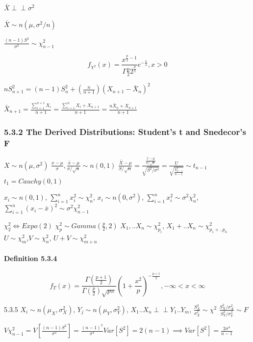 \documentclass[6pt,twocolumn,Portrait]{article}
\let\oldparagraph\paragraph
\renewcommand{\paragraph}[1]{\oldparagraph{#1}\mbox{}}
\begin{document}
\(\bar X\perp\!\!\!\perp\sigma^2\)

\(\bar X\sim n(\mu,\sigma^2/n)\)

\(\frac{(n-1)S^2}{\sigma^2}\sim\chi^2_{n-1}\)

\[f_{\chi^2}(x)=\frac{x^{\frac{p}2-1}}{\Gamma \frac{p}2 2^{\frac{p}2}}e^{-\frac{x}2}, x>0\]

\(nS^2_{n+1}=(n-1)S_n^2+(\frac{n}{n+1})(X_{n+1}-\bar X_n)^2\)

\(\bar X_{n+1}=\frac{\sum_{i=1}^{n+1}X_{i}}{n+1}=\frac{\sum_{i=1}^{n}X_{i}+X_{n+1}}{n+1}=\frac{n\bar X_{n}+X_{n+1}}{n+1}\)

\hypertarget{the-derived-distributions-students-t-and-snedecors-f}{%
\subsubsection{5.3.2 The Derived Distributions: Student's t and
Snedecor's
F}\label{the-derived-distributions-students-t-and-snedecors-f}}

\(X\sim n(\mu,\sigma^2)\)
\(\frac{x-\mu}{\sigma},\frac{\bar x-\mu}{\sigma/\sqrt{n}}\sim n(0,1)\)
\(\frac{\bar X-\mu}{S/\sqrt{n}}=\frac{\frac{\bar x-\mu}{\sigma/\sqrt{n}}}{\sqrt{S^2/\sigma^2}}=\frac{U}{\sqrt{\frac{\chi^2_{n-1}}{n-1}}}\sim t_{n-1}\)
\(t_1=Cauchy(0,1)\)

\(x_i\sim n(0,1)\), \(\sum_{i=1}^nx_i^2\sim \chi^2_n\),
\(x_i\sim n(0,\sigma^2)\), \(\sum_{i=1}^nx_i^2\sim \sigma^2\chi^2_n\),
\(\sum_{i=1}^n(x_i-\bar x)^2\sim \sigma^2\chi^2_{n-1}\)

\(\chi^2_{2}\Leftrightarrow Expo(2)\)
\(\chi^2_{p}\sim Gamma(\frac{p}2,2)\) \(X_1,..X_n\sim \chi^2_{p_i}\),
\(X_1+..X_n\sim \chi^2_{p_1+..p_n}\)
\(U\sim \chi^2_{m}\),\(V\sim \chi^2_{n}\), \(U+V\sim \chi^2_{m+n}\)

\hypertarget{T}{%
\paragraph{\texorpdfstring{\textbf{Definition
5.3.4}}{Definition 5.3.4}}\label{T}}

\[f_{T}(x)=\frac{\Gamma(\frac{p+1}2)}{\Gamma(\frac{p}2)\sqrt{p\pi}}\left (1+\frac{x^2}{p}\right)^{-\frac{p+1}2},-\infty<x<\infty\]

5.3.5 \(X_i\sim n(\mu_X,\sigma_X^2)\), \(Y_j\sim n(\mu_Y,\sigma_Y^2)\),
\(X_1..X_n\perp\!\!\!\perp Y_1..Y_m\),
\(\frac{S_X^2}{\sigma_X^2}\sim \chi^2\)
\(\frac{S_X^2/\sigma_X^2}{S_Y^2/\sigma_Y^2} \sim F\)

\(V\chi^2_{n-1}=V[\frac{(n-1)S^2}{\sigma^2}]=\frac{(n-1)^2}{\sigma^4}Var[S^2]=2(n-1)\implies Var[S^2]=\frac{2\sigma^4}{n-1}\)
\end{document}
